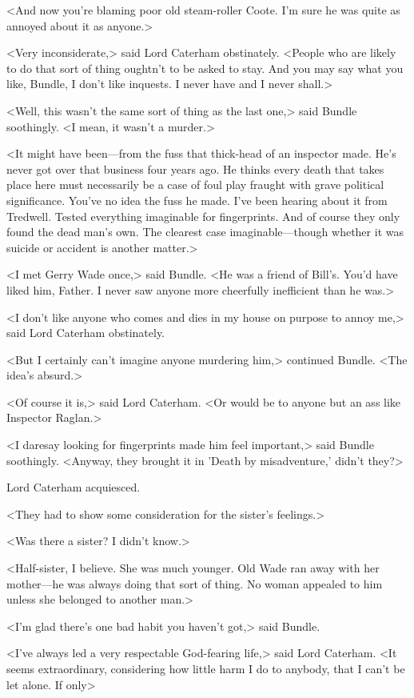 <And now you're blaming poor old steam-roller Coote. I'm sure he was quite as annoyed about it as anyone.>

<Very inconsiderate,> said Lord Caterham obstinately. <People who are likely to do that sort of thing oughtn't to be asked to stay. And you may say what you like, Bundle, I don't like inquests. I never have and I never shall.>

<Well, this wasn't the same sort of thing as the last one,> said Bundle soothingly. <I mean, it wasn't a murder.>

<It might have been—from the fuss that thick-head of an inspector made. He's never got over that business four years ago. He thinks every death that takes place here must necessarily be a case of foul play fraught with grave political significance. You've no idea the fuss he made. I've been hearing about it from Tredwell. Tested everything imaginable for fingerprints. And of course they only found the dead man's own. The clearest case imaginable—though whether it was suicide or accident is another matter.>

<I met Gerry Wade once,> said Bundle. <He was a friend of Bill's. You'd have liked him, Father. I never saw anyone more cheerfully inefficient than he was.>

<I don't like anyone who comes and dies in my house on purpose to annoy me,> said Lord Caterham obstinately.

<But I certainly can't imagine anyone murdering him,> continued Bundle. <The idea's absurd.>

<Of course it is,> said Lord Caterham. <Or would be to anyone but an ass like Inspector Raglan.>

<I daresay looking for fingerprints made him feel important,> said Bundle soothingly. <Anyway, they brought it in 'Death by misadventure,' didn't they?>

Lord Caterham acquiesced.

<They had to show some consideration for the sister's feelings.>

<Was there a sister? I didn't know.>

<Half-sister, I believe. She was much younger. Old Wade ran away with her mother—he was always doing that sort of thing. No woman appealed to him unless she belonged to another man.>

<I'm glad there's one bad habit you haven't got,> said Bundle.

<I've always led a very respectable God-fearing life,> said Lord Caterham. <It seems extraordinary, considering how little harm I do to anybody, that I can't be let alone. If only\longdash>

